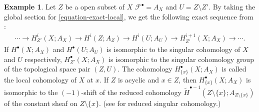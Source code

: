 \documentclass[a4paper,dvipdfmx,reqno,12pt]{amsart}
\theoremstyle{definition}
\newtheorem{example}[theorem]{Example}
\numberwithin{equation}{section}
\begin{document}
\begin{example}
\label{example-local-cohomology}
Let $Z$ be a open subset of $X$ 
$\mathcal{F}^{\bullet}=A_{X}$ 
and $U=Z\setminus Z'$.
By taking the global 
section for \cref{equation-exact-local}, we get 
the following exact sequence from 
\cite[Proposition 2.3.9 (iv)]{MR1299726}:
\begin{align}
  \cdots \to H^{i}_{Z'}(X;A_X)\to
H^{i}(Z;A_{Z})\to H^{i}(U;A_U)\to 
H^{i+1}_{Z'}(X;A_X) \to \cdots.
\end{align}
If $H^{\bullet}(X;A_X)$ and $H^{\bullet}(U;A_U)$ 
is isomorphic to the singular cohomology of $X$ and $U$
respectively, $H^{\bullet}_{Z'}(X;A_X)$ is isomorphic to
the singular cohomology group of the topological space 
pair $(Z,U)$.
The cohomology $H^{\bullet}_{\{x\}}(X;A_X)$ is called
the local cohomology of $X$ at $x$.
If $Z$ is acyclic and $x\in Z$, then $H^{\bullet}_{\{x\}}(X;A_X)$ is 
isomorphic to the $(-1)$-shift of the reduced cohomology 
$\tilde{H}^{\bullet-1}(Z\setminus \{x\};
A_{Z\setminus \{x\}})$
of the constant sheaf on $Z\setminus \{x\}$.
(see 
\cite[p.199]{hatcherAlgebraicTopology2002a} for 
reduced singular cohomology.)
\end{example}
\end{document}
